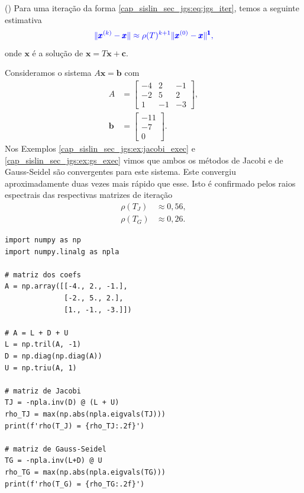 \begin{obs}()
  Para uma iteração da forma \eqref{cap_sislin_sec_jgs:eq:jgs_iter}, temos a seguinte estimativa
  \begin{equation}\color{blue}\|\pmb{x}^{(k)}-\pmb{x}\| \approx \rho(T)^{k+1}\|\pmb{x}^{(0)}-\pmb{x}\|^{\pmb{1}},
  \end{equation}
onde $\pmb{x}$ é a solução de $\pmb{x} = T\pmb{x} + \pmb{c}$.
\end{obs}

\begin{ex}
  Consideramos o sistema $A\pmb{x} = \pmb{b}$ com
  \begin{align}
    A &=
    \begin{bmatrix}
      -4 & 2 & -1 \\
      -2 & 5 & 2 \\
       1 & -1 & -3
    \end{bmatrix},\\
    \pmb{b} &=
    \begin{bmatrix}
      -11\\ -7\\ 0
    \end{bmatrix}.
  \end{align}
  Nos Exemplos \ref{cap_sislin_sec_jgs:ex:jacobi_exec} e \ref{cap_sislin_sec_jgs:ex:gs_exec} vimos que ambos os métodos de Jacobi e de Gauss-Seidel são convergentes para este sistema. Este convergiu aproximadamente duas vezes mais rápido que esse. Isto é confirmado pelos raios espectrais das respectivas matrizes de iteração
  \begin{align}
    \rho(T_J) &\approx 0,56,\\
    \rho(T_G) &\approx 0,26.
  \end{align}

\begin{lstlisting}
import numpy as np
import numpy.linalg as npla

# matriz dos coefs
A = np.array([[-4., 2., -1.],
              [-2., 5., 2.],
              [1., -1., -3.]])

# A = L + D + U
L = np.tril(A, -1)
D = np.diag(np.diag(A))
U = np.triu(A, 1)

# matriz de Jacobi
TJ = -npla.inv(D) @ (L + U)
rho_TJ = max(np.abs(npla.eigvals(TJ)))
print(f'rho(T_J) = {rho_TJ:.2f}')

# matriz de Gauss-Seidel
TG = -npla.inv(L+D) @ U
rho_TG = max(np.abs(npla.eigvals(TG)))
print(f'rho(T_G) = {rho_TG:.2f}')
\end{lstlisting}
\end{ex}

